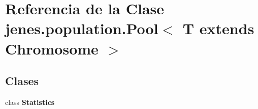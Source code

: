 \hypertarget{classjenes_1_1population_1_1_pool_3_01_t_01extends_01_chromosome_01_4}{\section{Referencia de la Clase jenes.\-population.\-Pool$<$ T extends Chromosome $>$}
\label{classjenes_1_1population_1_1_pool_3_01_t_01extends_01_chromosome_01_4}
}
\subsection*{Clases}
\begin{DoxyCompactItemize}
\item 
class {\bfseries Statistics}
\end{DoxyCompactItemize}
